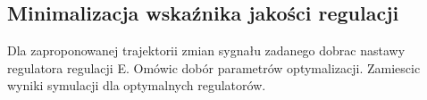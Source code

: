 \subsection{Minimalizacja wskaźnika jakości regulacji}
Dla zaproponowanej trajektorii zmian sygnału zadanego dobrac nastawy regulatora
regulacji E. Omówic dobór parametrów optymalizacji. Zamiescic wyniki symulacji dla
optymalnych regulatorów.
